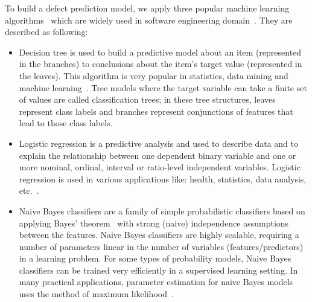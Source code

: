 To build a defect prediction model, we apply three popular machine learning algorithms~\cite{bishop2006pattern} which are widely used in software engineering domain~\cite{wang2016automatically, wang2013using, jing2014dictionary}. They are described as following: 
\begin{itemize}
	\item Decision tree is used to build a predictive model about an item (represented in the branches) to conclusions about the item's target value (represented in the leaves). This algorithm is very popular in statistics, data mining and machine learning~\cite{safavian1991survey}. Tree models where the target variable can take a finite set of values are called classification trees; in these tree structures, leaves represent class labels and branches represent conjunctions of features that lead to those class labels.
	\item Logistic regression is a predictive analysis and used to describe data and to explain the relationship between one dependent binary variable and one or more nominal, ordinal, interval or ratio-level independent variables. Logistic regression is used in various applications like: health, statistics, data analysis, etc.~\cite{hosmer2013applied}.
	\item Naive Bayes classifiers are a family of simple probabilistic classifiers based on applying Bayes' theorem~\cite{vapnik1998statistical} with strong (naive) independence assumptions between the features. Naive Bayes classifiers are highly scalable, requiring a number of parameters linear in the number of variables (features/predictors) in a learning problem. For some types of probability models, Naive Bayes classifiers can be trained very efficiently in a supervised learning setting. In many practical applications, parameter estimation for naive Bayes models uses the method of maximum likelihood~\cite{pan2002maximum}.
\end{itemize}




